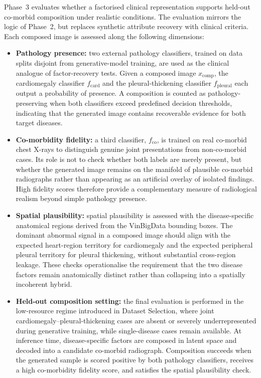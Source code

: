 Phase~3 evaluates whether a factorised clinical representation supports held-out co-morbid composition under realistic conditions.
The evaluation mirrors the logic of Phase~2, but replaces synthetic attribute recovery with clinical criteria.
Each composed image is assessed along the following dimensions:
\begin{itemize}
    \item \textbf{Pathology presence:} two external pathology classifiers, trained on data splits disjoint from generative-model training, are used as the clinical analogue of factor-recovery tests.
    Given a composed image $x_{\mathrm{comp}}$, the cardiomegaly classifier $f_{\mathrm{card}}$ and the pleural-thickening classifier $f_{\mathrm{pleural}}$ each output a probability of presence.
    A composition is counted as pathology-preserving when both classifiers exceed predefined decision thresholds, indicating that the generated image contains recoverable evidence for both target diseases.

    \item \textbf{Co-morbidity fidelity:} a third classifier, $f_{\mathrm{co}}$, is trained on real co-morbid chest X-rays to distinguish genuine joint presentations from non-co-morbid cases.
    Its role is not to check whether both labels are merely present, but whether the generated image remains on the manifold of plausible co-morbid radiographs rather than appearing as an artificial overlay of isolated findings.
    High fidelity scores therefore provide a complementary measure of radiological realism beyond simple pathology presence.

    \item \textbf{Spatial plausibility:} spatial plausibility is assessed with the disease-specific anatomical regions derived from the VinBigData bounding boxes.
    The dominant abnormal signal in a composed image should align with the expected heart-region territory for cardiomegaly and the expected peripheral pleural territory for pleural thickening, without substantial cross-region leakage.
    These checks operationalise the requirement that the two disease factors remain anatomically distinct rather than collapsing into a spatially incoherent hybrid.

    \item \textbf{Held-out composition setting:} the final evaluation is performed in the low-resource regime introduced in Dataset Selection, where joint cardiomegaly--pleural-thickening cases are absent or severely underrepresented during generative training, while single-disease cases remain available.
    At inference time, disease-specific factors are composed in latent space and decoded into a candidate co-morbid radiograph.
    Composition succeeds when the generated sample is scored positive by both pathology classifiers, receives a high co-morbidity fidelity score, and satisfies the spatial plausibility check.
\end{itemize}

